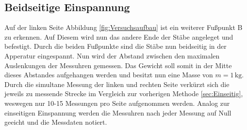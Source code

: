 \subsection{Beidseitige Einspannung}

Auf der linken Seite Abbildung \ref{fig:Versuchsaufbau} ist ein weiterer Fußpunkt B zu erkennen. Auf Diesem wird nun das
andere Ende der Stäbe angeleget und befestigt. Durch die beiden Fußpunkte sind die Stäbe nun beidseitig in der Apperatur
eingespannt. Nun wird der Abstand zwischen den maximalen Auslenkungen der Messuhren gemessen. Das Gewicht soll somit in der
Mitte dieses Abstandes aufgehangen werden und besitzt nun eine Masse von $m = 1\,\unit{\kilo\gram}$. Durch die simultane Messung der linken und rechten Seite verkürzt sich die jeweils
zu messende Strecke im Vergleich zur vorherigen Methode \ref{sec:Einseitig}, weswegen nur 10-15 Messungen pro Seite 
aufgenommen werden. Analog zur einseitigen Einspannung werden die Messuhren nach jeder Messung auf Null geeicht und die Messdaten notiert.

%

